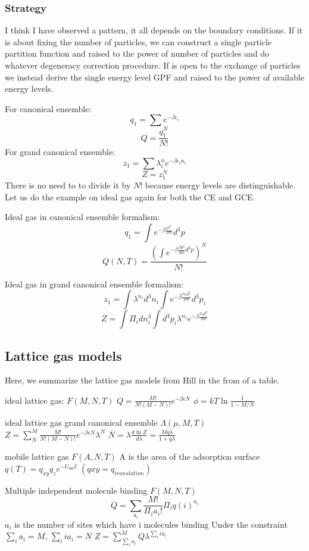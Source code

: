 \documentclass[12pt, oneside]{article}   	%
\begin{document}
\subsubsection*{Strategy} 
I think I have observed a pattern, it all depends on the boundary conditions. If it is about fixing the number of particles, we can construct a single particle partition function and raised to the power of number of particles and do whatever degeneracy correction procedure. If is open to the exchange of particles we instead derive the single energy level GPF and raised to the power of available energy levels. 
\par 
For canonical ensemble: 
$$q_1 = \sum e^{-\beta \epsilon_i}$$
$$Q = \frac{q_1 ^ N}{N!} $$
For grand canonical ensemble: 
$$z_1  = \sum \lambda^n_i e^{-\beta \epsilon_i n_i}$$
$$Z = z_1^N$$ 
There is no need to to divide it by $N!$ because energy levels are distinguishable. 
Let us do the example on ideal gas again for both the CE and GCE. 
\par 
Ideal gas in canonical ensemble formalism:
$$q_1 = \int e^{-\beta \frac{p^2}{2m} }d^3 p$$
$$Q(N, T) = \frac{(\int e^{-\beta \frac{\beta p^2}{2m} d^3 p})^N}{N!}$$
\par
Ideal gas in grand canonical ensemble formalism:
$$z_1 = \int \lambda^{n_{i}}  d^3 n_i \int e^{-\beta \frac{ n_1 p_i^2}{2m}}  d^3 p_i$$
$$Z = \int \Pi_i dn^3_i \int  d^3 p_i\lambda^{n_{i}} e^{-\beta \frac{ n_i p_i^2}{2m}}$$

\subsection{Lattice gas models} 
Here, we summarize the lattice gas models from Hill in the from of a table. 

ideal lattice gas: 
$F(M,N,T)$
$Q = \frac{M!}{N! (M-N)!} e^{-\beta \epsilon N}$
$\phi = kT \ln \frac{1}{1- M/N}$

ideal lattice gas grand canonical ensemble 
$\Lambda(\mu, M, T)$
$Z = \sum_N^{M} \frac{M!}{N!(M-N)!} e^{-\beta \epsilon N} \lambda^N$
$\overline{N} = \lambda \frac{d \ln Z }{d \lambda} = \frac{M q \lambda}{1 + q \lambda}$

mobile lattice gas
$F(A,N,T)$ A is the area of the adsorption surface 
$q(T) = q_{xy} q_z e^{-U_{00} \beta} $ $ (qxy  = q_{translation}) $

Multiple independent molecule binding 
$F(M,N,T)$
$$Q = \sum_{a_i} \frac{M!}{\Pi_i a_i! } \Pi_i q(i)^{a_i}$$
$a_i$ is the number of sites which have i molecules binding 
Under the constraint $\sum_i a_i = M$, $\sum_i i a_i = N $
$Z = \sum_{\sum_i a_i}^M Q \lambda^{\sum_i i a_i}$
\end{document}
